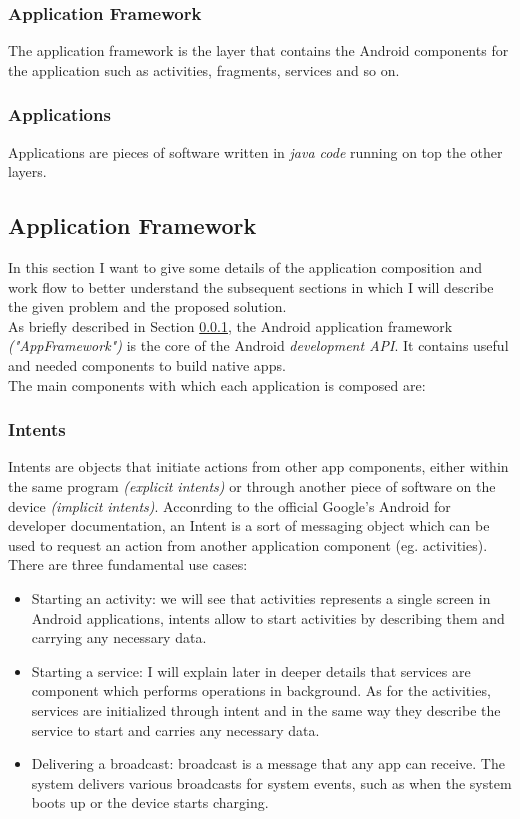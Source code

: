 \subsubsection{Application Framework}\label{appframework}
The application framework is the layer that contains the Android components for the application such as activities, fragments, services and so on. 
\subsubsection{Applications}
Applications are pieces of software written in \textit{java code} running on top the other layers.

\subsection{Application Framework}
In this section I want to give some details of the application composition and work flow to better understand the subsequent sections in which I will describe the given problem and the proposed solution.\\
As briefly described in Section \ref{appframework}, the Android application framework \textit{("AppFramework")} is the core of the Android \textit{development API}. It contains useful and needed components to build native apps.\\
The main components with which each application is composed are:

\subsubsection{Intents}\label{intents} Intents are objects that initiate actions from other app components, either within the same program \textit{(explicit intents)} or through another piece of software on the device \textit{(implicit intents)}.
Acconrding to the official Google's Android for developer documentation, an Intent is a sort of messaging object which can be used to request an action from another application component (eg. activities). There are three fundamental use cases:
\begin{itemize}
	\item Starting an activity: we will see that activities represents a single screen in Android applications, intents allow to start activities by describing them and carrying any necessary data.
	\item Starting a service: I will explain later in deeper details that services are component which performs operations in background. As for the activities, services are initialized through intent and in the same way they describe the service to start and carries any necessary data.
	\item Delivering a broadcast: broadcast is a message that any app can receive. The system delivers various broadcasts for system events, such as when the system boots up or the device starts charging.
\end{itemize}

